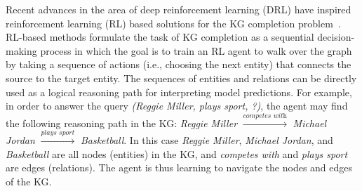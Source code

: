 Recent advances in the area of deep reinforcement learning (DRL) have inspired reinforcement learning (RL) based solutions for the KG completion problem~\cite{sharma2010graph,das2017go,xiong2017deeppath,lin2018multi,qu2018curriculum,shen2018m,lin2019rel4kc,xian2019reinforcement}. RL-based methods formulate the task of KG completion as a sequential decision-making process in which the goal is to train an RL agent to walk over the graph by taking a sequence of actions (i.e., choosing the next entity) that connects the source to the target entity. The sequences of entities and relations can be directly used as a logical reasoning path for interpreting model predictions. For example, in order to answer the query \textit{(Reggie Miller, plays sport, ?)}, the agent may find the following reasoning path in the KG: \textit{Reggie Miller} $\xrightarrow{\textit{competes with}}$ \textit{Michael Jordan} $\xrightarrow{\textit{plays sport}}$ \textit{Basketball}. In this case \textit{Reggie Miller}, \textit{Michael Jordan}, and \textit{Basketball} are all nodes (entities) in the KG, and \textit{competes with} and \textit{plays sport} are edges (relations). The agent is thus learning to navigate the nodes and edges of the KG.

